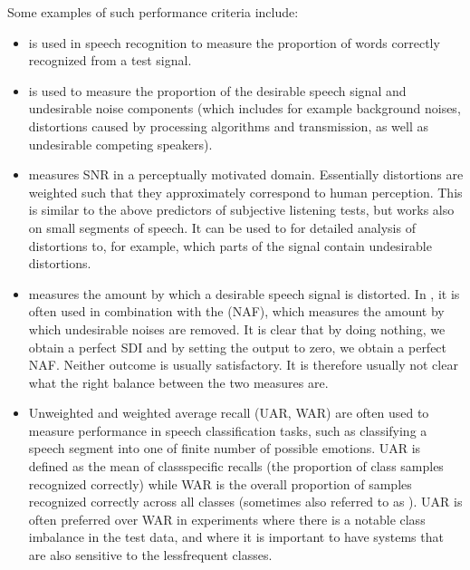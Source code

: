 \documentclass[letterpaper,10pt,english]{jupyterBook}
\begin{document}
\sphinxAtStartPar
Some examples of such performance criteria include:
\begin{itemize}
\item {} 
\sphinxAtStartPar
{} is used in
speech recognition to measure the proportion of words correctly
recognized from a test signal.

\item {} 
\sphinxAtStartPar
{} is used
to measure the proportion of the desirable speech signal and
undesirable noise components (which includes for example background
noises, distortions caused by processing algorithms and
transmission, as well as undesirable competing speakers).

\item {} 
\sphinxAtStartPar
{} measures SNR in a
perceptually motivated domain. Essentially distortions are weighted
such that they approximately correspond to human perception. This is
similar to the above predictors of subjective listening tests, but
works also on small segments of speech. It can be used to for
detailed analysis of distortions to, for example, which parts of the
signal contain undesirable distortions.

\item {} 
\sphinxAtStartPar
{} measures the amount by which a
desirable speech signal is distorted. In , it is often used in combination
with the  (NAF), which measures the amount
by which undesirable noises are removed. It is clear that by doing
nothing, we obtain a perfect SDI and by setting the output to zero,
we obtain a perfect NAF. Neither outcome is usually satisfactory. It
is therefore usually not clear what the right balance between the
two measures are.

\item {} 
\sphinxAtStartPar
Unweighted and weighted average recall (UAR, WAR) are often used to
measure performance in speech classification tasks, such as
classifying a speech segment into one of finite number of possible
emotions. UAR is defined as the mean of class\sphinxhyphen{}specific recalls (the
proportion of class samples recognized correctly) while WAR is the
overall proportion of samples recognized correctly across all
classes (sometimes also referred to as ). UAR is often
preferred over WAR in experiments where there is a notable class
imbalance in the test data, and where it is important to have
systems that are also sensitive to the less\sphinxhyphen{}frequent classes.


\end{itemize}
\end{document}
